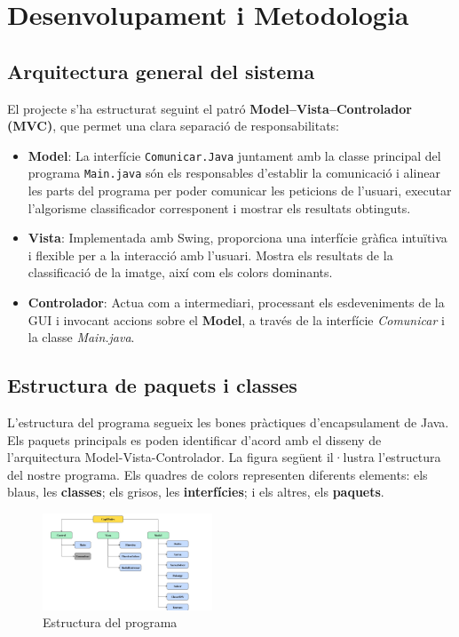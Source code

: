\documentclass{ieeetj}
\begin{document}
\section{Desenvolupament i Metodologia}

\subsection{Arquitectura general del sistema}
El projecte s'ha estructurat seguint el patró \textbf{Model–Vista–Controlador (MVC)}, que permet una clara separació de responsabilitats:
\begin{itemize}
    \item \textbf{Model}: La interfície \texttt{Comunicar.Java} juntament amb la classe principal del programa \texttt{Main.java} són els responsables d'establir la comunicació i alinear les parts del programa per poder comunicar les peticions de l'usuari, executar l'algorisme classificador corresponent i mostrar els resultats obtinguts.
    
    \item \textbf{Vista}: Implementada amb Swing, proporciona una interfície gràfica intuïtiva i flexible per a la interacció amb l'usuari. Mostra els resultats de la classificació de la imatge, així com els colors dominants. 

\item \textbf{Controlador}: Actua com a intermediari, processant els esdeveniments de la GUI i invocant accions sobre el \textbf{Model}, a través de la interfície \textit{Comunicar} i la classe \textit{Main.java}.

\end{itemize}
\subsection{Estructura de paquets i classes}
L'estructura del programa segueix les bones pràctiques d'encapsulament de Java. 
Els paquets principals es poden identificar d'acord amb el disseny de l'arquitectura Model-Vista-Controlador. 
La figura següent il·lustra l'estructura del nostre programa. \newline
Els quadres de colors representen diferents elements: \textcolor{blau}{els blaus}, les \textbf{classes}; \textcolor{gris}{els grisos}, les \textbf{interfícies};\textcolor{verd}{ i els altres}, els \textbf{paquets}.

\begin{figure}[H]
    \centering
    \includegraphics[width=0.45\textwidth]{png/estructure.jpg}
    \caption{Estructura del programa}
    \label{fig:enter-label}
\end{figure}
\end{document}
